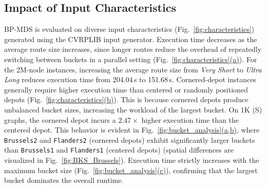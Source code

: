 \subsection{Impact of Input Characteristics}
\label{sec:topology_impact}


% 

BP-MDS is evaluated on diverse input characteristics (Fig.~\ref{fig:characteristics}) generated using the CVRPLIB input generator. Execution time decreases as the average route size increases, since longer routes reduce the overhead of repeatedly switching between buckets in a parallel setting (Fig.~\hyperref[fig:characteristics]{\ref*{fig:characteristics}(a)}). For the 2M-node instances, increasing the average route size from \emph{Very Short} to \emph{Ultra Long} reduces execution time from 204.04\,s to 151.68\,s. Cornered-depot instances generally require higher execution time than centered or randomly positioned depots (Fig.~\hyperref[fig:characteristics]{\ref*{fig:characteristics}(b)}). This is because cornered depots produce unbalanced bucket sizes, increasing the workload of the largest bucket. On 1K (S) graphs, the cornered depot incurs a $2.47\times$ higher execution time than the centered depot. This behavior is evident in Fig.~\hyperref[fig:bucket_analysis]{\ref*{fig:bucket_analysis}(a,b)}, where \texttt{Brussels2} and \texttt{Flanders2} (cornered depots) exhibit significantly larger buckets than \texttt{Brussels1} and \texttt{Flanders1} (centered depots) (spatial differences are visualized in Fig.~\ref{fig:BKS_Brussels}). Execution time strictly increases with the maximum bucket size (Fig.~\hyperref[fig:bucket_analysis]{\ref*{fig:bucket_analysis}(c)}), confirming that the largest bucket dominates the overall runtime. 

